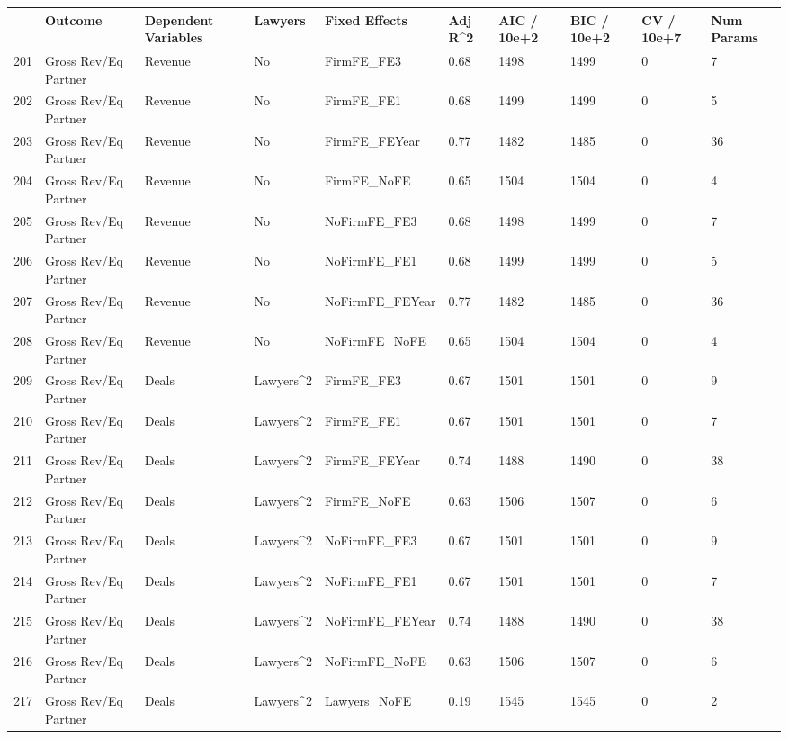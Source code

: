 \documentclass{article}
\begin{document}
\begin{table}[H]
\centering
\begin{tabular}{rlllllllll}
  \hline
 & Outcome & Dependent Variables & Lawyers & Fixed Effects & Adj R^2 & AIC / 10e+2 & BIC / 10e+2 & CV / 10e+7 & Num Params \\ 
  \hline
201 & Gross Rev/Eq Partner & Revenue & No & FirmFE\_FE3 & 0.68 & 1498 & 1499 & 0 & 7 \\ 
  202 & Gross Rev/Eq Partner & Revenue & No & FirmFE\_FE1 & 0.68 & 1499 & 1499 & 0 & 5 \\ 
  203 & Gross Rev/Eq Partner & Revenue & No & FirmFE\_FEYear & 0.77 & 1482 & 1485 & 0 & 36 \\ 
  204 & Gross Rev/Eq Partner & Revenue & No & FirmFE\_NoFE & 0.65 & 1504 & 1504 & 0 & 4 \\ 
  205 & Gross Rev/Eq Partner & Revenue & No & NoFirmFE\_FE3 & 0.68 & 1498 & 1499 & 0 & 7 \\ 
  206 & Gross Rev/Eq Partner & Revenue & No & NoFirmFE\_FE1 & 0.68 & 1499 & 1499 & 0 & 5 \\ 
  207 & Gross Rev/Eq Partner & Revenue & No & NoFirmFE\_FEYear & 0.77 & 1482 & 1485 & 0 & 36 \\ 
  208 & Gross Rev/Eq Partner & Revenue & No & NoFirmFE\_NoFE & 0.65 & 1504 & 1504 & 0 & 4 \\ 
  209 & Gross Rev/Eq Partner & Deals & Lawyers^2 & FirmFE\_FE3 & 0.67 & 1501 & 1501 & 0 & 9 \\ 
  210 & Gross Rev/Eq Partner & Deals & Lawyers^2 & FirmFE\_FE1 & 0.67 & 1501 & 1501 & 0 & 7 \\ 
  211 & Gross Rev/Eq Partner & Deals & Lawyers^2 & FirmFE\_FEYear & 0.74 & 1488 & 1490 & 0 & 38 \\ 
  212 & Gross Rev/Eq Partner & Deals & Lawyers^2 & FirmFE\_NoFE & 0.63 & 1506 & 1507 & 0 & 6 \\ 
  213 & Gross Rev/Eq Partner & Deals & Lawyers^2 & NoFirmFE\_FE3 & 0.67 & 1501 & 1501 & 0 & 9 \\ 
  214 & Gross Rev/Eq Partner & Deals & Lawyers^2 & NoFirmFE\_FE1 & 0.67 & 1501 & 1501 & 0 & 7 \\ 
  215 & Gross Rev/Eq Partner & Deals & Lawyers^2 & NoFirmFE\_FEYear & 0.74 & 1488 & 1490 & 0 & 38 \\ 
  216 & Gross Rev/Eq Partner & Deals & Lawyers^2 & NoFirmFE\_NoFE & 0.63 & 1506 & 1507 & 0 & 6 \\ 
  217 & Gross Rev/Eq Partner & Deals & Lawyers^2 & Lawyers\_NoFE & 0.19 & 1545 & 1545 & 0 & 2 \\ 

\end{tabular}
\end{table}
\end{document}
